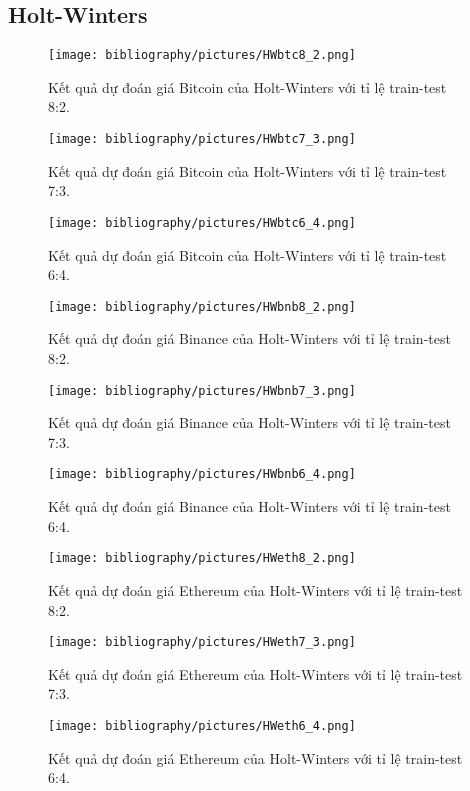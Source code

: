 \subsection{Holt-Winters}
\begin{figure}[h]
    \centering
    \texttt{[image: bibliography/pictures/HWbtc8\_2.png]}
    \caption{Kết quả dự đoán giá Bitcoin của Holt-Winters với tỉ lệ train-test 8:2.}
\end{figure}
\begin{figure}[h]
    \centering
    \texttt{[image: bibliography/pictures/HWbtc7\_3.png]}
    \caption{Kết quả dự đoán giá Bitcoin của Holt-Winters với tỉ lệ train-test 7:3.}
\end{figure}
\begin{figure}[h]
    \centering
    \texttt{[image: bibliography/pictures/HWbtc6\_4.png]}
    \caption{Kết quả dự đoán giá Bitcoin của Holt-Winters với tỉ lệ train-test 6:4.}
\end{figure}
\begin{figure}[h]
    \centering
    \texttt{[image: bibliography/pictures/HWbnb8\_2.png]}
    \caption{Kết quả dự đoán giá Binance của Holt-Winters với tỉ lệ train-test 8:2.}
\end{figure}
\begin{figure}[h]
    \centering
    \texttt{[image: bibliography/pictures/HWbnb7\_3.png]}
    \caption{Kết quả dự đoán giá Binance của Holt-Winters với tỉ lệ train-test 7:3.}
\end{figure}
\begin{figure}[h]
    \centering
    \texttt{[image: bibliography/pictures/HWbnb6\_4.png]}
    \caption{Kết quả dự đoán giá Binance của Holt-Winters với tỉ lệ train-test 6:4.}
\end{figure}
\begin{figure}[h]
    \centering
    \texttt{[image: bibliography/pictures/HWeth8\_2.png]}
    \caption{Kết quả dự đoán giá Ethereum của Holt-Winters với tỉ lệ train-test 8:2.}
\end{figure}
\begin{figure}[h]
    \centering
    \texttt{[image: bibliography/pictures/HWeth7\_3.png]}
    \caption{Kết quả dự đoán giá Ethereum của Holt-Winters với tỉ lệ train-test 7:3.}
\end{figure}
\begin{figure}[h]
    \centering
    \texttt{[image: bibliography/pictures/HWeth6\_4.png]}
    \caption{Kết quả dự đoán giá Ethereum của Holt-Winters với tỉ lệ train-test 6:4.}
\end{figure}